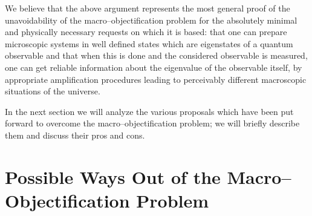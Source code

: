 \documentclass[12pt]{article}
\begin{document}
We believe that the above argument represents the most general
proof of the unavoidability of  the macro--objectification problem
for the absolutely minimal and physically necessary requests on
which it is based: that  one can prepare microscopic systems in
well defined states which are eigenstates of a quantum observable
and that when this is done and the considered observable is
measured, one can  get reliable information about the eigenvalue
of the observable itself, by appropriate amplification procedures
leading to perceivably different macroscopic situations of the
universe.

In the next section we will analyze the various proposals which
have been put forward to overcome the macro--objectification
problem; we will briefly describe them and discuss their pros and
cons.

\section{Possible Ways Out of the Macro--Objecti\-fi\-ca\-ti\-on
Problem} \label{sec3}
\end{document}
